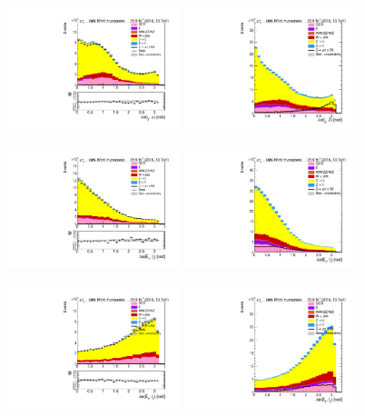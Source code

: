 \begin{figure}[htp]
	\includegraphics[width=0.45\textwidth]{plots/mt/DeltaPhiL2Z_CR.pdf}
	\includegraphics[width=0.45\textwidth]{plots/mt/DeltaPhiL2Z_withsignal.pdf}

	\includegraphics[width=0.45\textwidth]{plots/mt/DeltaPhiMetL1_CR.pdf}
	\includegraphics[width=0.45\textwidth]{plots/mt/DeltaPhiMetL1_withsignal.pdf}

	\includegraphics[width=0.45\textwidth]{plots/mt/DeltaPhiMetL2_CR.pdf}
	\includegraphics[width=0.45\textwidth]{plots/mt/DeltaPhiMetL2_withsignal.pdf}
\end{figure}


